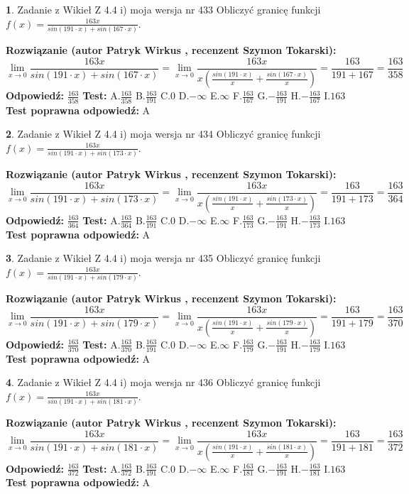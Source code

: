 \documentclass[12pt, a4paper]{article}
\theoremstyle{definition} %
\newtheorem{zad}{}
\newcommand{\zadStart}[1]{\begin{zad}#1\newline}
\newcommand{\zadStop}{\end{zad}}
\newcommand{\rozwStart}[2]{\noindent \textbf{Rozwiązanie (autor #1 , recenzent #2): }\newline}
\newcommand{\rozwStop}{\newline}
\newcommand{\odpStart}{\noindent \textbf{Odpowiedź:}\newline}
\newcommand{\odpStop}{\newline}
\newcommand{\testStart}{\noindent \textbf{Test:}\newline}
\newcommand{\testStop}{\newline}
\newcommand{\kluczStart}{\noindent \textbf{Test poprawna odpowiedź:}\newline}
\newcommand{\kluczStop}{\newline}
\begin{document}
\zadStart{Zadanie z Wikieł Z 4.4 i) moja wersja nr 433}
Obliczyć granicę funkcji $f(x)=\frac{163x}{sin(191\cdot x) +sin(167\cdot x)}$.
\zadStop
\rozwStart{Patryk Wirkus}{Szymon Tokarski}
$$\lim\limits_{x\to 0}\frac{163x}{sin(191\cdot x) +sin(167\cdot x)}=\lim\limits_{x\to 0}\frac{163x}{x(\frac{sin(191\cdot x)}{x}+\frac{sin(167\cdot x)}{x})}=\frac{163}{191+167} = \frac{163}{358}$$
\rozwStop
\odpStart
$\frac{163}{358}$
\odpStop
\testStart
A.$\frac{163}{358}$
B.$\frac{163}{191}$
C.$0$
D.$-\infty$
E.$\infty$
F.$\frac{163}{167}$
G.$-\frac{163}{191}$
H.$-\frac{163}{167}$
I.$163$
\testStop
\kluczStart
A
\kluczStop



\zadStart{Zadanie z Wikieł Z 4.4 i) moja wersja nr 434}
Obliczyć granicę funkcji $f(x)=\frac{163x}{sin(191\cdot x) +sin(173\cdot x)}$.
\zadStop
\rozwStart{Patryk Wirkus}{Szymon Tokarski}
$$\lim\limits_{x\to 0}\frac{163x}{sin(191\cdot x) +sin(173\cdot x)}=\lim\limits_{x\to 0}\frac{163x}{x(\frac{sin(191\cdot x)}{x}+\frac{sin(173\cdot x)}{x})}=\frac{163}{191+173} = \frac{163}{364}$$
\rozwStop
\odpStart
$\frac{163}{364}$
\odpStop
\testStart
A.$\frac{163}{364}$
B.$\frac{163}{191}$
C.$0$
D.$-\infty$
E.$\infty$
F.$\frac{163}{173}$
G.$-\frac{163}{191}$
H.$-\frac{163}{173}$
I.$163$
\testStop
\kluczStart
A
\kluczStop



\zadStart{Zadanie z Wikieł Z 4.4 i) moja wersja nr 435}
Obliczyć granicę funkcji $f(x)=\frac{163x}{sin(191\cdot x) +sin(179\cdot x)}$.
\zadStop
\rozwStart{Patryk Wirkus}{Szymon Tokarski}
$$\lim\limits_{x\to 0}\frac{163x}{sin(191\cdot x) +sin(179\cdot x)}=\lim\limits_{x\to 0}\frac{163x}{x(\frac{sin(191\cdot x)}{x}+\frac{sin(179\cdot x)}{x})}=\frac{163}{191+179} = \frac{163}{370}$$
\rozwStop
\odpStart
$\frac{163}{370}$
\odpStop
\testStart
A.$\frac{163}{370}$
B.$\frac{163}{191}$
C.$0$
D.$-\infty$
E.$\infty$
F.$\frac{163}{179}$
G.$-\frac{163}{191}$
H.$-\frac{163}{179}$
I.$163$
\testStop
\kluczStart
A
\kluczStop



\zadStart{Zadanie z Wikieł Z 4.4 i) moja wersja nr 436}
Obliczyć granicę funkcji $f(x)=\frac{163x}{sin(191\cdot x) +sin(181\cdot x)}$.
\zadStop
\rozwStart{Patryk Wirkus}{Szymon Tokarski}
$$\lim\limits_{x\to 0}\frac{163x}{sin(191\cdot x) +sin(181\cdot x)}=\lim\limits_{x\to 0}\frac{163x}{x(\frac{sin(191\cdot x)}{x}+\frac{sin(181\cdot x)}{x})}=\frac{163}{191+181} = \frac{163}{372}$$
\rozwStop
\odpStart
$\frac{163}{372}$
\odpStop
\testStart
A.$\frac{163}{372}$
B.$\frac{163}{191}$
C.$0$
D.$-\infty$
E.$\infty$
F.$\frac{163}{181}$
G.$-\frac{163}{191}$
H.$-\frac{163}{181}$
I.$163$
\testStop
\kluczStart
A
\kluczStop
\end{document}
